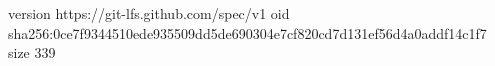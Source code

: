 version https://git-lfs.github.com/spec/v1
oid sha256:0ce7f9344510ede935509dd5de690304e7cf820cd7d131ef56d4a0addf14c1f7
size 339
